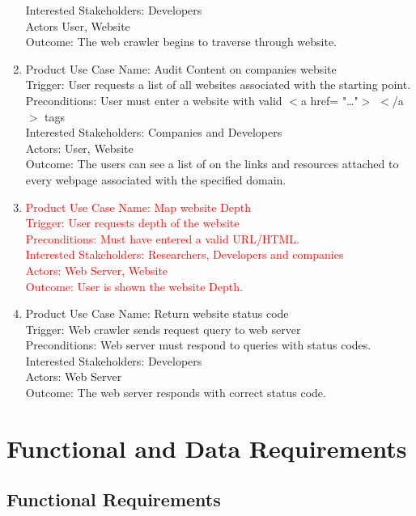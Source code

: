 \documentclass[titlepage]{article}
\begin{document}
\begin{enumerate}
Interested Stakeholders: Developers\\
Actors User, Website\\
Outcome: The web crawler begins to traverse through website.\\
  \item Product Use Case Name: Audit Content on companies website \\
Trigger: User requests a list of all websites associated with the starting point.\\
Preconditions: User must enter a website with valid $<$a href= "\ldots"$>$ $<$/a$>$ tags\\
Interested Stakeholders: Companies and Developers\\
Actors: User, Website\\
Outcome: The users can see a list of on the links and resources attached to every webpage associated with the specified domain.\\
  \item \textcolor{red}{ Product Use Case Name: Map website Depth\\
Trigger: User requests depth of the website\\
Preconditions: Must have entered a valid URL/HTML.\\
Interested Stakeholders: Researchers, Developers and companies\\
Actors: Web Server, Website\\
Outcome: User is shown the website Depth.\\}
  \item Product Use Case Name: Return website status code\\
Trigger: Web crawler sends request query to web server\\
Preconditions: Web server must respond to queries with status codes. \\
Interested Stakeholders: Developers\\
Actors: Web Server\\
Outcome: The web server responds with correct status code.\\
\end{enumerate}

\section{Functional and Data Requirements}

\subsection*{Functional Requirements}
\end{document}
